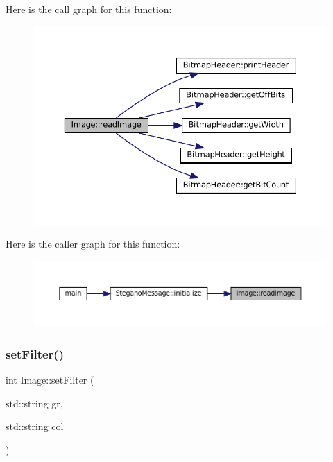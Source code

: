 Here is the call graph for this function\+:
\nopagebreak
\begin{figure}[H]
\begin{center}
\leavevmode
\includegraphics[width=350pt]{classImage_ac0aa1f41cb368d87b20dd38839218d93_cgraph}
\end{center}
\end{figure}
Here is the caller graph for this function\+:
\nopagebreak
\begin{figure}[H]
\begin{center}
\leavevmode
\includegraphics[width=350pt]{classImage_ac0aa1f41cb368d87b20dd38839218d93_icgraph}
\end{center}
\end{figure}
\mbox{\label{classImage_ac81078a3d6c364aada9afc3c8a668ef8}} 
\subsubsection{\texorpdfstring{setFilter()}{setFilter()}}
{\footnotesize\ttfamily int Image\+::set\+Filter (\begin{DoxyParamCaption}\item[{std\+::string}]{gr,  }\item[{std\+::string}]{col }\end{DoxyParamCaption})}



